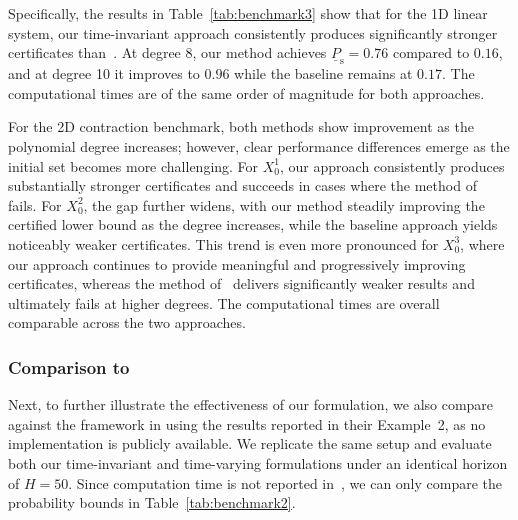 \documentclass[journal,twoside,web]{ieeecolor}
\newcommand{\safe}{\mathrm{s}}
\newcommand{\reach}{\mathrm{r}}
\newcommand{\initial}{\mathrm{0}}
\newcommand{\low}[1]{\underline{#1}}
\newcommand{\rv}[1]{\textcolor{blue}{#1}}
\theoremstyle{definition}
\theoremstyle{plain}
\theoremstyle{plain}
\begin{document}
Specifically, the results in Table~\ref{tab:benchmark3} show that for the 1D linear system, our time-invariant approach consistently produces significantly stronger certificates than~\cite{vzikelic2023learning}. At degree 8, our method achieves $\low{P}_\safe = 0.76$ compared to $0.16$, and at degree 10 it improves to $0.96$ while the baseline remains at $0.17$. The computational times are of the same order of magnitude for both approaches. 

For the 2D contraction benchmark, both methods show improvement as the polynomial degree increases; however, clear performance differences emerge as the initial set becomes more challenging. For $X_{\initial}^1$, our approach consistently produces substantially stronger certificates and succeeds in cases where the method of~\cite{vzikelic2023learning} fails. For $X_{\initial}^2$, the gap further widens, with our method steadily improving the certified lower bound as the degree increases, while the baseline approach yields noticeably weaker certificates. This trend is even more pronounced for $X_{\initial}^3$, where our approach continues to provide meaningful and progressively improving certificates, whereas the method of~\cite{vzikelic2023learning} delivers significantly weaker results and ultimately fails at higher degrees. The computational times are overall comparable across the two approaches.

\subsubsection{Comparison to \cite{xue2025finite}}

Next, to further illustrate the effectiveness of our formulation, we also compare against the framework in \cite{xue2025finite} using the results reported in their Example~2, as no implementation is publicly available. We replicate the same setup and evaluate both our time-invariant and time-varying formulations under an identical horizon of $H=50$. Since computation time is not reported in~\cite{xue2025finite}, we can only compare the probability bounds in Table~\ref{tab:benchmark2}.

\end{document}
